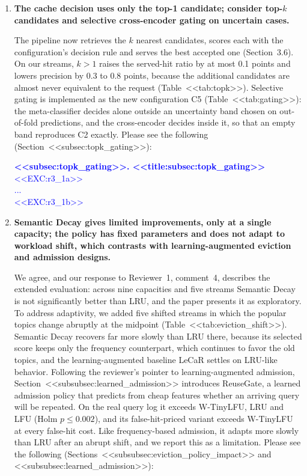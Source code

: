 \documentclass[11pt]{article}
\begin{document}
\begin{enumerate}[leftmargin=*, itemsep=1.2em]

\item \textbf{The cache decision uses only the top-1 candidate; consider top-$k$ candidates and selective cross-encoder gating on uncertain cases.}

The pipeline now retrieves the $k$ nearest candidates, scores each with the configuration's decision rule and serves the best accepted one (Section~3.6). On our streams, $k>1$ raises the served-hit ratio by at most 0.1 points and lowers precision by 0.3 to 0.8 points, because the additional candidates are almost never equivalent to the request (Table~<<tab:topk>>). Selective gating is implemented as the new configuration C5 (Table~<<tab:gating>>): the meta-classifier decides alone outside an uncertainty band chosen on out-of-fold predictions, and the cross-encoder decides inside it, so that an empty band reproduces C2 exactly. Please see the following (Section~<<subsec:topk_gating>>):

\textcolor{blue}{\textbf{<<subsec:topk_gating>>. <<title:subsec:topk_gating>>}\\
<<EXC:r3_1a>>\\
...\\
<<EXC:r3_1b>>}

\item \textbf{Semantic Decay gives limited improvements, only at a single capacity; the policy has fixed parameters and does not adapt to workload shift, which contrasts with learning-augmented eviction and admission designs.}

We agree, and our response to Reviewer~1, comment~4, describes the extended evaluation: across nine capacities and five streams Semantic Decay is not significantly better than LRU, and the paper presents it as exploratory. To address adaptivity, we added five shifted streams in which the popular topics change abruptly at the midpoint (Table~<<tab:eviction_shift>>). Semantic Decay recovers far more slowly than LRU there, because its selected score keeps only the frequency counterpart, which continues to favor the old topics, and the learning-augmented baseline LeCaR settles on LRU-like behavior. Following the reviewer's pointer to learning-augmented admission, Section~<<subsubsec:learned_admission>> introduces ReuseGate, a learned admission policy that predicts from cheap features whether an arriving query will be repeated. On the real query log it exceeds W-TinyLFU, LRU and LFU (Holm $p\leq 0.002$), and its false-hit-priced variant exceeds W-TinyLFU at every false-hit cost. Like frequency-based admission, it adapts more slowly than LRU after an abrupt shift, and we report this as a limitation. Please see the following (Sections~<<subsubsec:eviction_policy_impact>> and <<subsubsec:learned_admission>>):


\end{enumerate}
\end{document}
